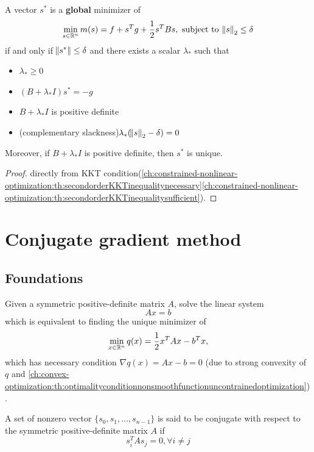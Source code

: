\begin{refsection}
\begin{theorem}
\end{theorem}



\begin{theorem}
A vector $s^*$ is a \textbf{global} minimizer of 
$$\min_{s\in \mathbb{R}^n} m(s) = f + s^T g + \frac{1}{2}s^TBs,~\text{subject to}~ \norm{s}_2 \leq \delta$$
if and only if $\norm{s^*} \leq \delta$ and there exists a scalar $\lambda_*$ such that
\begin{itemize}
	\item $\lambda_* \geq 0$
	\item $(B + \lambda_* I) s^* = -g$
	\item $B + \lambda_* I$ is positive definite
	\item (complementary slackness)$\lambda_*(\norm{s}_2 - \delta) = 0$
\end{itemize}
Moreover, if $B + \lambda_* I$ is positive definite, then $s^*$ is unique.
\end{theorem}
\begin{proof}
directly from KKT condition(\autoref{ch:constrained-nonlinear-optimization:th:secondorderKKTinequalitynecessary}\autoref{ch:constrained-nonlinear-optimization:th:secondorderKKTinequalitysufficient}).
\end{proof}


\section{Conjugate gradient method}
\subsection{Foundations}
\begin{definition}\cite[120]{bertsekas2016nonlinear}
Given a symmetric positive-definite matrix $A$, solve the linear system 
$$Ax = b$$
which is equivalent to finding the unique minimizer of
$$\min_{x\in \mathbb{R}^n} q(x) = \frac{1}{2}x^TAx - b^Tx,$$
which has necessary condition $\nabla q(x) = Ax - b = 0$ (due to strong convexity of $q$ and \autoref{ch:convex-optimization:th:optimalityconditionnonsmoothfunctionuncontrainedoptimization}).
\end{definition}

\begin{definition}
A set of nonzero vector $\{s_0,s_1,...,s_{n-1}\}$ is said to be conjugate with respect to the symmetric positive-definite matrix $A$ if
$$s_i^TAs_j = 0, \forall i\neq j$$
\end{definition}


\end{refsection}

